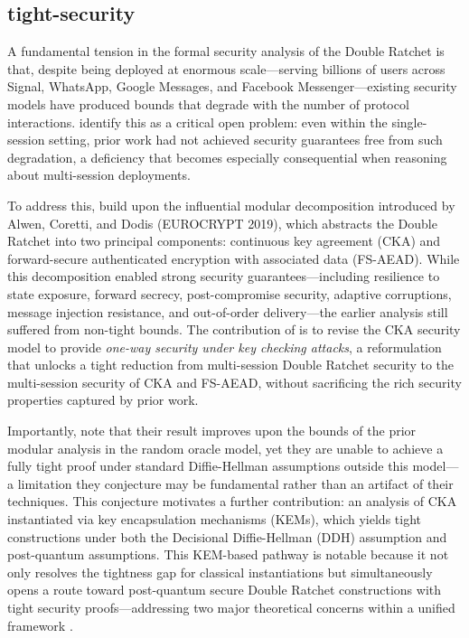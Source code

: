 \subsection{tight-security}

A fundamental tension in the formal security analysis of the Double Ratchet is that, despite being deployed at enormous scale—serving billions of users across Signal, WhatsApp, Google Messages, and Facebook Messenger—existing security models have produced bounds that degrade with the number of protocol interactions. \textcite{collins2024} identify this as a critical open problem: even within the single-session setting, prior work had not achieved security guarantees free from such degradation, a deficiency that becomes especially consequential when reasoning about multi-session deployments.

To address this, \textcite{collins2024} build upon the influential modular decomposition introduced by Alwen, Coretti, and Dodis (EUROCRYPT 2019), which abstracts the Double Ratchet into two principal components: continuous key agreement (CKA) and forward-secure authenticated encryption with associated data (FS-AEAD). While this decomposition enabled strong security guarantees—including resilience to state exposure, forward secrecy, post-compromise security, adaptive corruptions, message injection resistance, and out-of-order delivery—the earlier analysis still suffered from non-tight bounds. The contribution of \textcite{collins2024} is to revise the CKA security model to provide \emph{one-way security under key checking attacks}, a reformulation that unlocks a tight reduction from multi-session Double Ratchet security to the multi-session security of CKA and FS-AEAD, without sacrificing the rich security properties captured by prior work.

Importantly, \textcite{collins2024} note that their result improves upon the bounds of the prior modular analysis in the random oracle model, yet they are unable to achieve a fully tight proof under standard Diffie-Hellman assumptions outside this model—a limitation they conjecture may be fundamental rather than an artifact of their techniques. This conjecture motivates a further contribution: an analysis of CKA instantiated via key encapsulation mechanisms (KEMs), which yields tight constructions under both the Decisional Diffie-Hellman (DDH) assumption and post-quantum assumptions. This KEM-based pathway is notable because it not only resolves the tightness gap for classical instantiations but simultaneously opens a route toward post-quantum secure Double Ratchet constructions with tight security proofs—addressing two major theoretical concerns within a unified framework \parencite{collins2024}.

